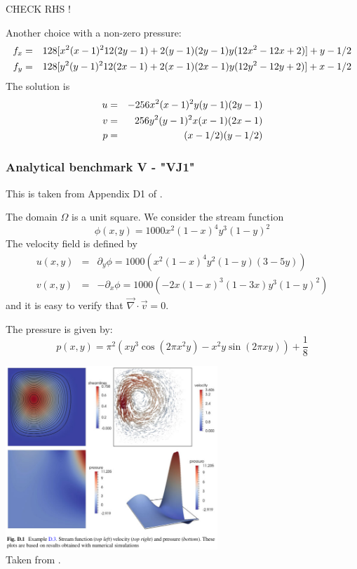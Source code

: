 CHECK RHS !

Another choice with a non-zero pressure:
\begin{eqnarray}
f_x &=& 128[ x^2(x-1)^2 12 (2y-1) + 2 (y-1)(2y-1)y(12x^2-12x+2)  ] + y - 1/2 \nonumber\\
f_y &=& 128[ y^2(y-1)^2 12 (2x-1) + 2 (x-1)(2x-1)y(12y^2-12y+2)  ] + x - 1/2 \nonumber\\
\end{eqnarray}
The solution is
\begin{eqnarray}
u &=& -256x^2(x-1)^2y(y-1)(2y-1) \nonumber\\
v &=&  256y^2(y-1)^2x(x-1)(2x-1) \nonumber\\
p &=& (x-1/2)(y-1/2) 
\end{eqnarray}


\subsubsection{Analytical benchmark V \label{mms5} - "VJ1"}

This is taken from Appendix D1 of \cite{john16}.

The domain $\Omega$ is a unit square. We consider the stream function
\[
\phi(x,y)=1000x^2(1-x)^4y^3(1-y)^2
\]
The velocity field is defined by
\begin{eqnarray}
u(x,y) &=&  \partial_y \phi = 1000(x^2(1-x)^4 y^2 (1-y)(3-5y)  ) \\
v(x,y) &=& -\partial_x \phi = 1000(-2x(1-x)^3(1-3x)y^3(1-y)^2)
\end{eqnarray}
and it is easy to verify that $\vec\nabla\cdot\vec v=0$.

The pressure is given by:
\[
p(x,y)=\pi^2( xy^3\cos(2\pi x^2y) - x^2y \sin(2\pi xy)) + \frac{1}{8}
\]

\begin{center}
\includegraphics[width=8cm]{images/mms/mms5}\\
Taken from \cite{john16}.
\end{center}


